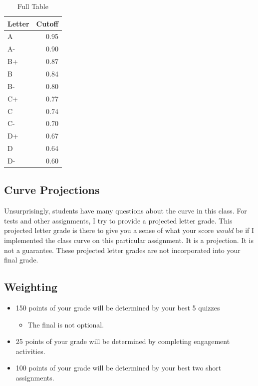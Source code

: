 \documentclass[
]{book}
\providecommand{\tightlist}{%
  \setlength{\itemsep}{0pt}\setlength{\parskip}{0pt}}
\begin{document}
\begin{table}

\caption{\label{tab:unnamed-chunk-7}Full Table}
\centering
\begin{tabular}[t]{l|r}
\hline
Letter & Cutoff\\
\hline
A & 0.95\\
\hline
A- & 0.90\\
\hline
B+ & 0.87\\
\hline
B & 0.84\\
\hline
B- & 0.80\\
\hline
C+ & 0.77\\
\hline
C & 0.74\\
\hline
C- & 0.70\\
\hline
D+ & 0.67\\
\hline
D & 0.64\\
\hline
D- & 0.60\\
\hline
\end{tabular}
\end{table}

\subsection*{Curve Projections}\label{curve-projections-1}


Unsurprisingly, students have many questions about the curve in this class. For tests and other assignments, I try to provide a projected letter grade.
This projected letter grade is there to give you a sense of what your score \emph{would} be if I implemented the class curve on this particular assignment.
It is a projection. It is not a guarantee. These projected letter grades are not incorporated into your final grade.

\subsection*{Weighting}\label{weighting}


\begin{itemize}
\tightlist
\item
  150 points of your grade will be determined by your best 5 quizzes

  \begin{itemize}
  \tightlist
  \item
    The final is not optional.
  \end{itemize}
\item
  25 points of your grade will be determined by completing engagement activities.
\item
  100 points of your grade will be determined by your best two short assignments.
\end{itemize}
\end{document}
